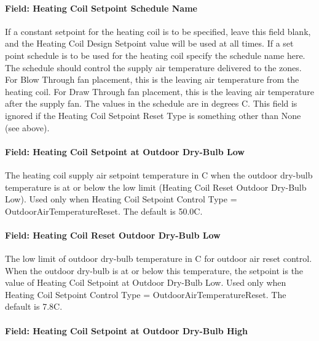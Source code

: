\paragraph{Field: Heating Coil Setpoint Schedule Name}\label{field-heating-coil-setpoint-schedule-name-3}

If a constant setpoint for the heating coil is to be specified, leave this field blank, and the Heating Coil Design Setpoint value will be used at all times. If a set point schedule is to be used for the heating coil specify the schedule name here. The schedule should control the supply air temperature delivered to the zones. For Blow Through fan placement, this is the leaving air temperature from the heating coil. For Draw Through fan placement, this is the leaving air temperature after the supply fan. The values in the schedule are in degrees C. This field is ignored if the Heating Coil Setpoint Reset Type is something other than None (see above).

\paragraph{Field: Heating Coil Setpoint at Outdoor Dry-Bulb Low}\label{field-heating-coil-setpoint-at-outdoor-dry-bulb-low-1}

The heating coil supply air setpoint temperature in C when the outdoor dry-bulb temperature is at or below the low limit (Heating Coil Reset Outdoor Dry-Bulb Low). Used only when Heating Coil Setpoint Control Type = OutdoorAirTemperatureReset. The default is 50.0C.

\paragraph{Field: Heating Coil Reset Outdoor Dry-Bulb Low}\label{field-heating-coil-reset-outdoor-dry-bulb-low-1}

The low limit of outdoor dry-bulb temperature in C for outdoor air reset control. When the outdoor dry-bulb is at or below this temperature, the setpoint is the value of Heating Coil Setpoint at Outdoor Dry-Bulb Low. Used only when Heating Coil Setpoint Control Type = OutdoorAirTemperatureReset. The default is 7.8C.

\paragraph{Field: Heating Coil Setpoint at Outdoor Dry-Bulb High}\label{field-heating-coil-setpoint-at-outdoor-dry-bulb-high-1}

